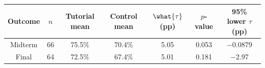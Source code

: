 \begin{tabular}{|c|c|c|c|c|c|c|}
\hline
Outcome & $n$ & Tutorial mean & Control mean & $\what{\tau}$ (pp) & $p$-value & 95\% lower $\tau$ (pp) \\
\hline\hline
Midterm & 66 & 75.5\% & 70.4\% & 5.05 & 0.053 & $-$0.0879 \\
\hline
Final & 64 & 72.5\% & 67.4\% & 5.01 & 0.181 & $-$2.97 \\
\hline
\end{tabular}

